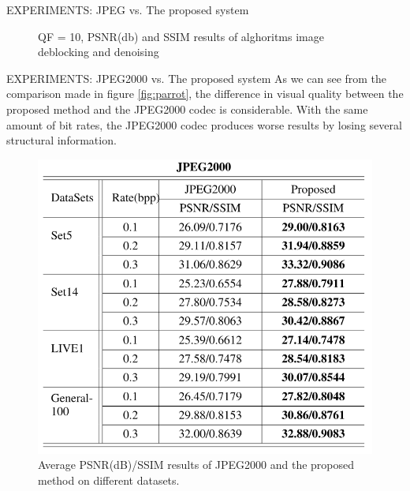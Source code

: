 \begin{frame}{EXPERIMENTS: JPEG vs. The proposed system}
\begin{minipage}{\linewidth}
\begin{minipage}{0.45\linewidth}
\begin{figure}[htbp]
                \caption{QF = 10, PSNR(db) and SSIM results of alghoritms image deblocking and denoising}
                \centering
            \end{figure}
        \end{minipage}
    \end{minipage}
\end{frame}

\begin{frame}{EXPERIMENTS: JPEG2000 vs. The proposed system}
    As we can see from the comparison made in figure \ref{fig:parrot}, the difference in  
    visual quality between the proposed method and the JPEG2000 codec is 
    considerable. With the same amount of bit rates, the JPEG2000 codec 
    produces worse results by losing several structural information. 
    \begin{minipage}{\linewidth}
        \centering
        \begin{minipage}{0.45\linewidth}
            \begin{figure}[H]
                \includegraphics[width = 1 \linewidth]{images/paper3/JPEG2000.png}                
                \caption{Average PSNR(dB)/SSIM results of JPEG2000 and the proposed method on different datasets.}
            \end{figure}
        \end{minipage}
        \hspace{0.05\linewidth}
        \begin{minipage}{0.45\linewidth}

\end{minipage}
\end{minipage}
\end{frame}

